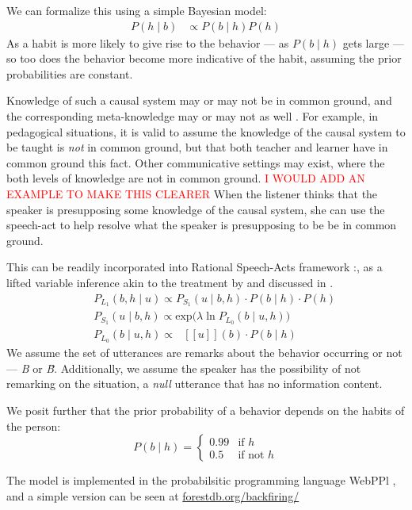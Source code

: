 \documentclass[10pt,letterpaper]{article}
\newcommand{\denote}[1]{\mbox{ $[\![ #1 ]\!]$}}
\newcommand{\red}[1]{\textcolor{Red}{#1}}
\begin{document}
We can formalize this using a simple Bayesian model:
\begin{align*}
P(h \mid b) & \propto P(b \mid h) P(h) 
\end{align*}
As a habit is more likely to give rise to the behavior --- as $P(b \mid h)$ gets large --- so too does the behavior become more indicative of the habit, assuming the prior probabilities are constant. 

Knowledge of such a causal system may or may not be in common ground, and the corresponding meta-knowledge may or may not as well \cite{Clark1977, Clark1996}. 
For example, in pedagogical situations, it is valid to assume the knowledge of the causal system to be taught is \emph{not} in common ground, but that both teacher and learner have in common ground this fact.
Other communicative settings may exist, where the both levels of knowledge are not in common ground.  \red{I WOULD ADD AN EXAMPLE TO MAKE THIS CLEARER}
When the listener thinks that the speaker is presupposing some knowledge of the causal system, she can use the speech-act to help resolve what the speaker is presupposing to be be in common ground.

This can be readily incorporated into Rational Speech-Acts framework \cite{Frank2012, Goodman2013}:, as a lifted variable inference akin to the treatment by  and discussed in .
%
\begin{eqnarray}
&&P_{L_1}(b, h \mid u)\propto P_{S_1}(u \mid b, h)\cdot P(b \mid h) \cdot P(h) \label{eq:L1}\\
&&P_{S_1}(u \mid b, h) \propto \mathrm{exp}({\lambda \ln P_{L_0}(b \mid u, h))} \label{eq:S1}\\
&&P_{L_0}(b \mid u, h)\propto \denote{u}(b) \cdot P(b \mid h) \label{eq:L0}
\end{eqnarray}
%
We assume the set of utterances are remarks about the behavior occurring or not --- \emph{B} or \emph{\~B}. 
Additionally, we assume the speaker has the possibility of not remarking on the situation, a \emph{null} utterance that has no information content.  

We posit further that the prior probability of a behavior depends on the habits of the person:
$$
P(b \mid h) = \begin{cases}
0.99  & \text{if } h\\
0.5  & \text{if not } h
\end{cases}
$$

The model is implemented in the probabilsitic programming language WebPPl \cite{dippl}, and a simple version can be seen at \url{forestdb.org/backfiring/}
\end{document}

